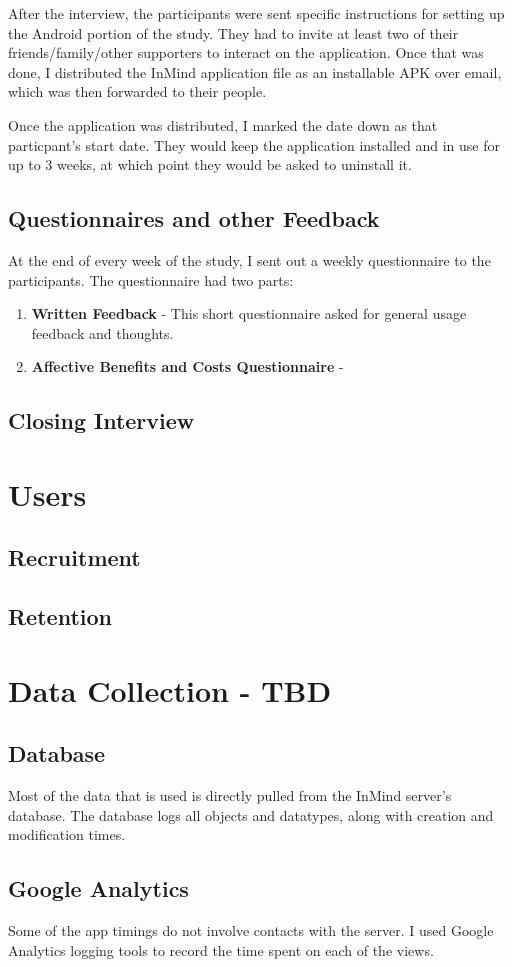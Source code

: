   After the interview, the participants were sent specific instructions
  for setting up the Android portion of the study.
  They had to invite at least two of their friends/family/other supporters
  to interact on the application.
  Once that was done, I distributed the InMind application file as
  an installable APK over email, which was then forwarded to their people.

  Once the application was distributed,
  I marked the date down as that particpant's start date.
  They would keep the application installed and in use for up to 3 weeks,
  at which point they would be asked to uninstall it.

  \subsection{Questionnaires and other Feedback}
  At the end of every week of the study,
  I sent out a weekly questionnaire to the participants.
  The questionnaire had two parts:
  \begin{enumerate}
  \item \textbf{Written Feedback} -
  This short questionnaire asked for
  general usage feedback and thoughts.

  \item \textbf{Affective Benefits and Costs Questionnaire} -


  \end{enumerate}


  \subsection{Closing Interview}

\section{Users}

  \subsection{Recruitment}

  \subsection{Retention}

\section{Data Collection - TBD}
  \subsection{Database}
    Most of the data that is used is directly pulled from
    the InMind server's database.
    The database logs all objects and datatypes,
    along with creation and modification times.

  \subsection{Google Analytics}
    Some of the app timings do not involve contacts with the server.
    I used Google Analytics logging tools to record the time spent
    on each of the views.
